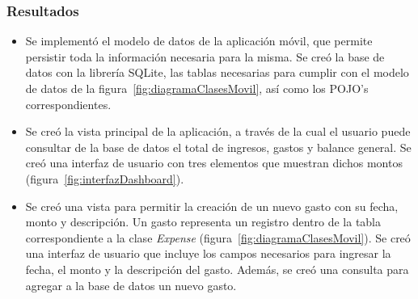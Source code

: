 \subsubsection{Resultados}
\begin{itemize}
\item Se implementó el modelo de datos de la aplicación móvil, que permite persistir toda la información necesaria para la misma. Se creó la base de datos con la librería SQLite, las tablas necesarias para cumplir con el modelo de datos de la figura~\ref{fig:diagramaClasesMovil}, así como los POJO's correspondientes.
\item Se creó la vista principal de la aplicación, a través de la cual el usuario puede consultar de la base de datos el total de ingresos, gastos y balance general. Se creó una interfaz de usuario con tres elementos que muestran dichos montos (figura~\ref{fig:interfazDashboard}).
\item Se creó una vista para permitir la creación de un nuevo gasto con su fecha, monto y descripción. Un gasto representa un registro dentro de la tabla correspondiente a la clase \textit{Expense} (figura~\ref{fig:diagramaClasesMovil}). Se creó una interfaz de usuario que incluye los campos necesarios para ingresar la fecha, el monto y la descripción del gasto. Además, se creó una consulta para agregar a la base de datos un nuevo gasto.
\end{itemize}

%
%

